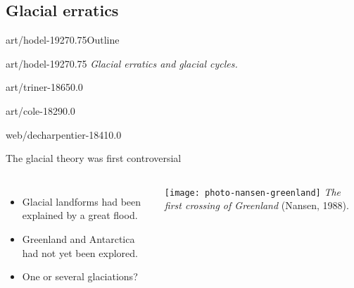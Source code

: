 \begin{CJK}{UTF8}{min}
\subsection{Glacial erratics}

    \begin{sectionframe}{art/hodel-1927}{0.75}{Outline}
      \tableofcontents
    \end{sectionframe}

    \begin{sectionframe}{art/hodel-1927}{0.75}{\insertsectionhead}
      \emph{Glacial erratics and glacial cycles.}
    \end{sectionframe}

    \begin{backgroundframe}[t]{art/triner-1865}{0.0}{}
      \flushleft{}
    \end{backgroundframe}

    \begin{backgroundframe}[t]{art/cole-1829}{0.0}{}
      \flushleft{}
    \end{backgroundframe}

    \begin{backgroundframe}[b]{web/decharpentier-1841}{0.0}{}
      \flushleft{}
    \end{backgroundframe}

    \begin{frame}{The glacial theory was first controversial}
      \begin{columns}
        \column{60mm}
          \begin{itemize}[<+->]
            \item Glacial landforms had been explained by a great flood.
            \bigskip
            \item Greenland and Antarctica had not yet been explored.
            \bigskip
            \item One or several glaciations?
          \end{itemize}
          \texttt{[image: photo-nansen-greenland]}  %
          \emph{The first crossing of Greenland} (Nansen, 1988).
      \end{columns}
    \end{frame}


\end{CJK}
